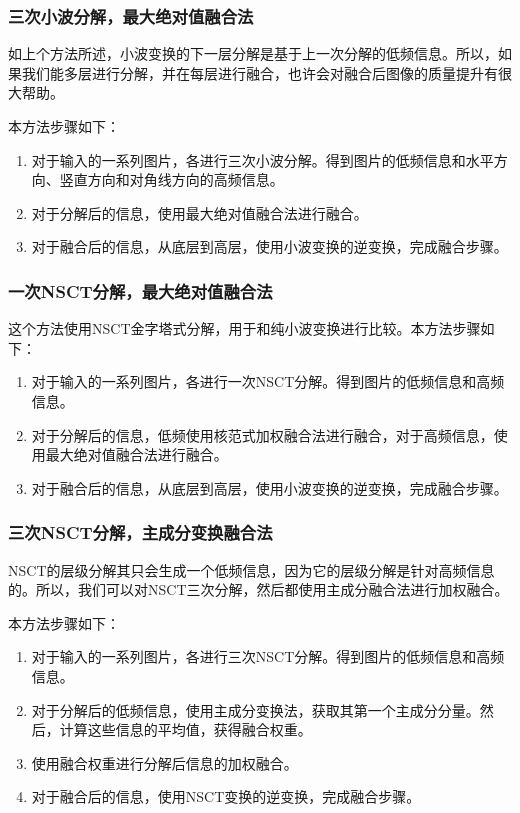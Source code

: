 \documentclass{xduugthesis}
\begin{document}
\subsubsection{三次小波分解，最大绝对值融合法}
如上个方法所述，小波变换的下一层分解是基于上一次分解的低频信息。所以，如果我们能多层进行分解，并在每层进行融合，也许会对融合后图像的质量提升有很大帮助。\par
本方法步骤如下：
\begin{enumerate}
	\item 对于输入的一系列图片，各进行三次小波分解。得到图片的低频信息和水平方向、竖直方向和对角线方向的高频信息。
	\item 对于分解后的信息，使用最大绝对值融合法进行融合。
	\item 对于融合后的信息，从底层到高层，使用小波变换的逆变换，完成融合步骤。
\end{enumerate}
\subsubsection{一次NSCT分解，最大绝对值融合法}
这个方法使用NSCT金字塔式分解，用于和纯小波变换进行比较。本方法步骤如下：
\begin{enumerate}
	\item 对于输入的一系列图片，各进行一次NSCT分解。得到图片的低频信息和高频信息。
	\item 对于分解后的信息，低频使用核范式加权融合法进行融合，对于高频信息，使用最大绝对值融合法进行融合。
	\item 对于融合后的信息，从底层到高层，使用小波变换的逆变换，完成融合步骤。
\end{enumerate}
\subsubsection{三次NSCT分解，主成分变换融合法}
NSCT的层级分解其只会生成一个低频信息，因为它的层级分解是针对高频信息的。所以，我们可以对NSCT三次分解，然后都使用主成分融合法进行加权融合。\par
本方法步骤如下：
\begin{enumerate}
	\item 对于输入的一系列图片，各进行三次NSCT分解。得到图片的低频信息和高频信息。
	\item 对于分解后的低频信息，使用主成分变换法，获取其第一个主成分分量。然后，计算这些信息的平均值，获得融合权重。
	\item 使用融合权重进行分解后信息的加权融合。
	\item 对于融合后的信息，使用NSCT变换的逆变换，完成融合步骤。
\end{enumerate}
\end{document}
